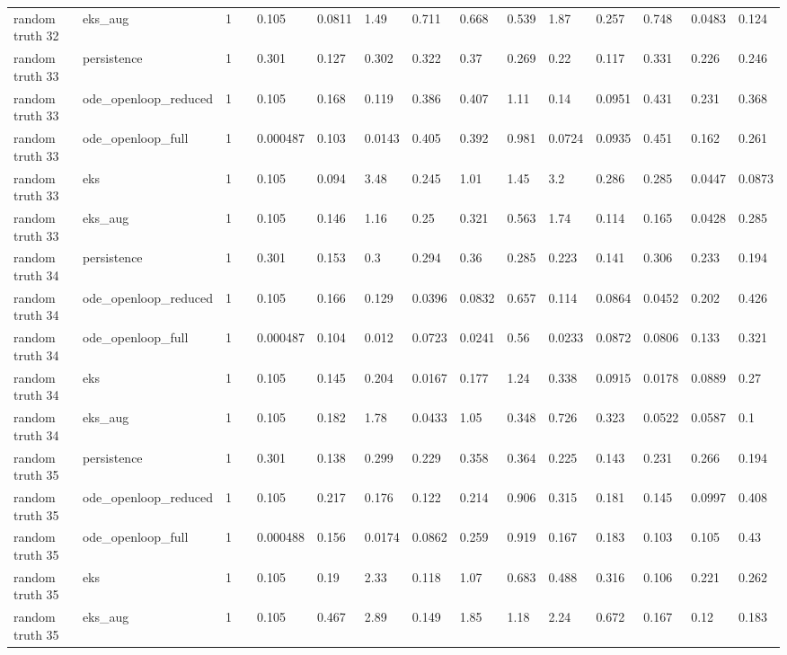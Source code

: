 \begin{table}[t]
\begin{tabular}{lllllllllllllll}
random truth 32 & eks\_aug & 1 &  & 0.105 & 0.0811 & 1.49 & 0.711 & 0.668 & 0.539 & 1.87 & 0.257 & 0.748 & 0.0483 & 0.124 \\
random truth 33 & persistence & 1 &  & 0.301 & 0.127 & 0.302 & 0.322 & 0.37 & 0.269 & 0.22 & 0.117 & 0.331 & 0.226 & 0.246 \\
random truth 33 & ode\_openloop\_reduced & 1 &  & 0.105 & 0.168 & 0.119 & 0.386 & 0.407 & 1.11 & 0.14 & 0.0951 & 0.431 & 0.231 & 0.368 \\
random truth 33 & ode\_openloop\_full & 1 &  & 0.000487 & 0.103 & 0.0143 & 0.405 & 0.392 & 0.981 & 0.0724 & 0.0935 & 0.451 & 0.162 & 0.261 \\
random truth 33 & eks & 1 &  & 0.105 & 0.094 & 3.48 & 0.245 & 1.01 & 1.45 & 3.2 & 0.286 & 0.285 & 0.0447 & 0.0873 \\
random truth 33 & eks\_aug & 1 &  & 0.105 & 0.146 & 1.16 & 0.25 & 0.321 & 0.563 & 1.74 & 0.114 & 0.165 & 0.0428 & 0.285 \\
random truth 34 & persistence & 1 &  & 0.301 & 0.153 & 0.3 & 0.294 & 0.36 & 0.285 & 0.223 & 0.141 & 0.306 & 0.233 & 0.194 \\
random truth 34 & ode\_openloop\_reduced & 1 &  & 0.105 & 0.166 & 0.129 & 0.0396 & 0.0832 & 0.657 & 0.114 & 0.0864 & 0.0452 & 0.202 & 0.426 \\
random truth 34 & ode\_openloop\_full & 1 &  & 0.000487 & 0.104 & 0.012 & 0.0723 & 0.0241 & 0.56 & 0.0233 & 0.0872 & 0.0806 & 0.133 & 0.321 \\
random truth 34 & eks & 1 &  & 0.105 & 0.145 & 0.204 & 0.0167 & 0.177 & 1.24 & 0.338 & 0.0915 & 0.0178 & 0.0889 & 0.27 \\
random truth 34 & eks\_aug & 1 &  & 0.105 & 0.182 & 1.78 & 0.0433 & 1.05 & 0.348 & 0.726 & 0.323 & 0.0522 & 0.0587 & 0.1 \\
random truth 35 & persistence & 1 &  & 0.301 & 0.138 & 0.299 & 0.229 & 0.358 & 0.364 & 0.225 & 0.143 & 0.231 & 0.266 & 0.194 \\
random truth 35 & ode\_openloop\_reduced & 1 &  & 0.105 & 0.217 & 0.176 & 0.122 & 0.214 & 0.906 & 0.315 & 0.181 & 0.145 & 0.0997 & 0.408 \\
random truth 35 & ode\_openloop\_full & 1 &  & 0.000488 & 0.156 & 0.0174 & 0.0862 & 0.259 & 0.919 & 0.167 & 0.183 & 0.103 & 0.105 & 0.43 \\
random truth 35 & eks & 1 &  & 0.105 & 0.19 & 2.33 & 0.118 & 1.07 & 0.683 & 0.488 & 0.316 & 0.106 & 0.221 & 0.262 \\
random truth 35 & eks\_aug & 1 &  & 0.105 & 0.467 & 2.89 & 0.149 & 1.85 & 1.18 & 2.24 & 0.672 & 0.167 & 0.12 & 0.183 \\

\end{tabular}
\end{table}
